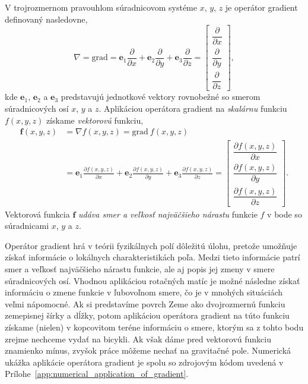 \documentclass[a4paper, 12pt]{book}
\newcommand{\grad}{\mathrm{grad}}
\let\vec\mathbf
\begin{document}
V trojrozmernom pravouhlom súradnicovom systéme $x$, $y$, $z$ je operátor 
gradient definovaný nasledovne,
%
\begin{equation}
\label{eq:gradient}
\nabla = \grad = \vec e_1 \frac{\partial}{\partial x} + \vec e_2 
\frac{\partial}{\partial y} + \vec e_3 \frac{\partial}{\partial z} =
\begin{bmatrix}
\dfrac{\partial}{\partial x} \\[2ex]
\dfrac{\partial}{\partial y} \\[2ex]
\dfrac{\partial}{\partial z}
\end{bmatrix}
{,}
\end{equation}
%
kde $\vec e_1$, $\vec e_2$ a $\vec e_3$ predstavujú jednotkové vektory 
rovnobežné so smerom súradnicových osí $x$, $y$ a $z$.  Aplikáciou operátora 
gradient na \emph{skalárnu} funkciu $f(x, y, z)$ získame \emph{vektorovú} 
funkciu,
%
\begin{equation}
\begin{split}
\vec f(x, y, z) &= \nabla f(x, y, z) = \grad \ f(x, y, z)\\
%
&= \vec e_1 \frac{\partial f(x, y, z)}{\partial x} + \vec e_2 \frac{\partial 
f(x, y, z)}{\partial y} + \vec e_3 \frac{\partial f(x, y, z)}{\partial z} =
\begin{bmatrix}
\dfrac{\partial f(x, y, z)}{\partial x} \\[2ex]
\dfrac{\partial f(x, y, z)}{\partial y} \\[2ex]
\dfrac{\partial f(x, y, z)}{\partial z}
\end{bmatrix}
{.}
\end{split}
\end{equation}
%
Vektorová funkcia $\vec f$ \emph{udáva smer a veľkosť najväčšieho nárastu} 
funkcie $f$ v bode so súradnicami $x$, $y$ a $z$.

Operátor gradient hrá v teórii fyzikálnych polí dôležitú úlohu, pretože 
umožňuje získať informácie o lokálnych charakteristikách poľa.  Medzi tieto 
informácie patrí smer a veľkosť najväčšieho nárastu funkcie, ale aj popis jej 
zmeny v smere súradnicových osí.  Vhodnou aplikáciou rotačných matíc je možné 
následne získať informáciu o zmene funkcie v ľubovoľnom smere, čo je v mnohých 
situáciách veľmi nápomocné.  Ak si predstavíme povrch Zeme ako dvojrozmernú 
funkciu zemepisnej šírky a dĺžky, potom aplikáciou operátora gradient na túto 
funkciu získame (nielen) v kopcovitom teréne informáciu o smere, ktorým sa 
z tohto bodu zrejme nechceme vydať na bicykli.  Ak však dáme pred vektorovú 
funkciu znamienko mínus, zvyšok práce môžeme nechať na gravitačné pole.  
Numerická ukážka aplikácie operátora gradient je spolu so zdrojovým kódom 
uvedená v Prílohe~\ref{app:numerical_application_of_gradient}.
\end{document}
